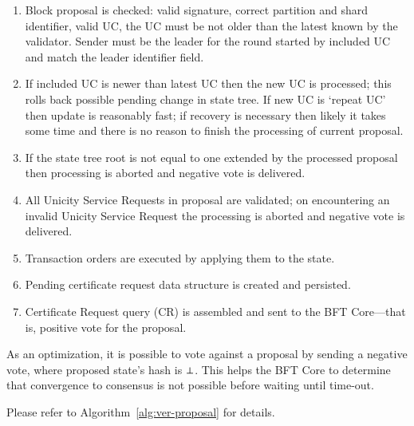 \begin{enumerate}
  \item Block proposal is checked: valid signature, correct partition and shard identifier, valid UC, the UC must be not older than the latest known by the validator. Sender must be the leader for the round started by included UC and match the leader identifier field.
  \item If included UC is newer than latest UC then the new UC is processed; this rolls back possible pending change in state tree. If new UC is `repeat UC' then update is reasonably fast; if recovery is necessary then likely it takes some time and there is no reason to finish the processing of current proposal.
  \item If the state tree root is not equal to one extended by the processed proposal then processing is aborted and negative vote is delivered.
  \item All Unicity Service Requests in proposal are validated; on encountering an invalid Unicity Service Request the processing is aborted and negative vote is delivered.
  \item Transaction orders are executed by applying them to the state.
  \item Pending certificate request data structure is created and persisted.
  \item Certificate Request query (CR) is assembled and sent to the BFT Core---that is, positive vote for the proposal.
\end{enumerate}

As an optimization, it is possible to vote against a proposal by sending a negative vote, where proposed state's hash is $\bot$. This helps the BFT Core to determine that convergence to consensus is not possible before waiting until time-out.

Please refer to Algorithm~\ref{alg:ver-proposal} for details.

